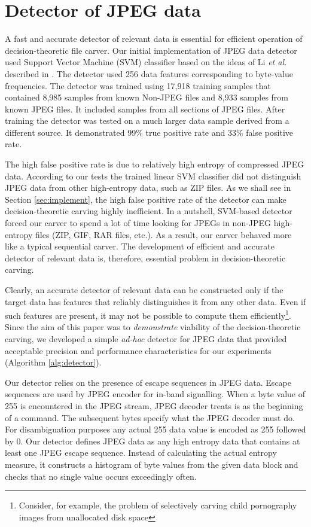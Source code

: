 \documentclass[final,5p,times,twocolumn,authoryear]{elsarticle}
\begin{document}
\section{Detector of JPEG data}
\label{sec:detector}

A fast and accurate detector of relevant data is essential for efficient operation of decision-theoretic file carver. Our initial implementation of JPEG data detector used Support Vector Machine (SVM) classifier based on the ideas of Li \emph{et al.} described in \citep{li2011novel}. The detector used 256 data features corresponding to byte-value frequencies. The detector was trained using 17,918 training samples that contained 8,985 samples from known Non-JPEG files and 8,933 samples from known JPEG files. It included samples from all sections of JPEG files. After training the detector was tested on a much larger data sample derived from a different source. It demonstrated 99\% true positive rate and 33\% false positive rate. 

The high false positive rate is due to relatively high entropy of compressed JPEG data. According to our tests the trained linear SVM classifier did not distinguish JPEG data from other high-entropy data, such as ZIP files. As we shall see in Section \ref{sec:implement}, the high false positive rate of the detector can make decision-theoretic carving highly inefficient. In a nutshell, SVM-based detector forced our carver to spend a lot of time looking for JPEGs in non-JPEG high-entropy files (ZIP, GIF, RAR files, etc.). As a result, our carver behaved more like a typical sequential carver. The development of efficient and accurate detector of relevant data is, therefore, essential problem in decision-theoretic carving. 

Clearly, an accurate detector of relevant data can be constructed only if the target data has features that reliably distinguishes it from any other data. Even if such features are present, it may not be possible to compute them efficiently\footnote{Consider, for example, the problem of selectively carving child pornography images from unallocated disk space}. Since the aim of this paper was to \emph{demonstrate} viability of the decision-theoretic carving, we developed a simple \emph{ad-hoc} detector for JPEG data that provided acceptable precision and performance characteristics for our experiments (Algorithm \ref{alg:detector}).  

Our detector relies on the presence of escape sequences in JPEG data. Escape sequences are used by JPEG encoder for in-band signalling. When a byte value of 255 is encountered in the JPEG stream, JPEG decoder treats is as the beginning of a command. The subsequent bytes specify what the JPEG decoder must do. For disambiguation purposes any actual 255 data value is encoded as 255 followed by 0.  Our detector defines JPEG data as any high entropy data that contains at least one JPEG escape sequence. Instead of calculating the actual entropy measure, it constructs a histogram of byte values from the given data block and checks that no single value occurs exceedingly often.
\end{document}
